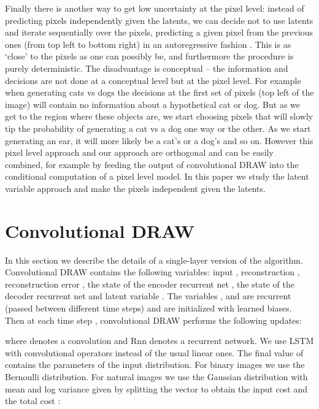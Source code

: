 \documentclass{article}
\begin{document}
Finally there is another way to get low uncertainty at the pixel level: instead of predicting pixels independently given the latents, we can decide not to use latents and iterate sequentially over the pixels, predicting a given pixel from the previous ones (from top left to bottom right) in an autoregressive fashion \citep{bengio1999modeling, graves2009offline, larochelle2011neural, gregor2011learning, oord2016pixel}. This is as `close' to the pixels as one can possibly be, and furthermore the procedure is purely deterministic. The disadvantage is conceptual -- the information and decisions are not done at a conceptual level but at the pixel level. For example when generating cats vs dogs the decisions at the first set of pixels (top left of the image) will contain no information about a hypothetical cat or dog. But as we get to the region where these objects are, we start choosing pixels that will slowly tip the probability of generating a cat vs a dog one way or the other. As we start generating an ear, it will more likely be a cat's or a dog's and so on. 
However this pixel level approach and our approach are orthogonal and can be easily combined, for example by feeding the output of convolutional DRAW into the conditional computation of a pixel level model. In this paper we study the latent variable approach and make the pixels independent given the latents.





\section{Convolutional DRAW}





In this section we describe the details of a single-layer version of the algorithm. Convolutional DRAW contains the following variables: input , reconstruction , reconstruction error , the state of the encoder recurrent net , the state of the decoder recurrent net  and latent variable . The variables ,  and  are recurrent (passed between different time steps) and are initialized with learned biases. Then at each time step , convolutional DRAW performs the following updates:







where  denotes a convolution and Rnn denotes a recurrent network. We use LSTM \citep{hochreiter1997long} with convolutional operators instead of the usual linear ones. The final value of  contains the parameters of the input distribution. For binary images we use the Bernoulli distribution. For natural images we use the Gaussian distribution with mean and log variance given by splitting the vector  to obtain the input cost  and the total cost :
 
\end{document}
